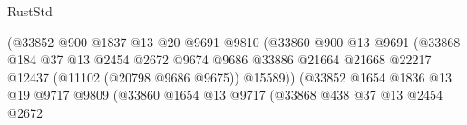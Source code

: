 \begin{lexlean}{RustStd}
\begin{coremodule}
                                                  (@33852
                                                    @900
                                                    @1837
                                                    @13
                                                    @20
                                                    @9691
                                                    @9810
                                                    (@33860
                                                      @900
                                                      @13
                                                      @9691
                                                      (@33868
                                                        @184
                                                        @37
                                                        @13
                                                        @2454
                                                        @2672
                                                        @9674
                                                        @9686
                                                        @33886
                                                        @21664
                                                        @21668
                                                        @22217
                                                        @12437
                                                        (@11102 (@20798 @9686 @9675))
                                                        @15589))
                                                    (@33852
                                                      @1654
                                                      @1836
                                                      @13
                                                      @19
                                                      @9717
                                                      @9809
                                                      (@33860
                                                        @1654
                                                        @13
                                                        @9717
                                                        (@33868
                                                          @438
                                                          @37
                                                          @13
                                                          @2454
                                                          @2672

\end{coremodule}
\end{lexlean}
